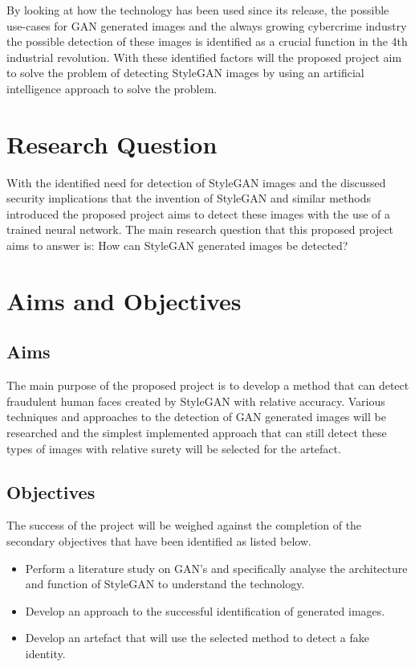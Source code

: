By looking at how the technology has been used since its release, the possible use-cases for GAN generated images and the always growing cybercrime industry the possible detection of these images is identified as a crucial function in the 4th industrial revolution. With these identified factors will the proposed project aim to solve the problem of detecting StyleGAN images by using an artificial intelligence approach to solve the problem.

\section{Research Question}

With the identified need for detection of StyleGAN images and the discussed security implications that the invention of StyleGAN and similar methods introduced the proposed project aims to detect these images with the use of a trained neural network. The main research question that this proposed project aims to answer is: How can StyleGAN generated images be detected?

\section{Aims and Objectives}
\subsection{Aims}

The main purpose of the proposed project is to develop a method that can detect fraudulent human faces created by StyleGAN with relative accuracy. Various techniques and approaches to the detection of GAN generated images will be researched and the simplest implemented approach that can still detect these types of images with relative surety will be selected for the artefact.

\subsection{Objectives}

The success of the project will be weighed against the completion of the secondary objectives that have been identified as listed below.

\begin{itemize}
	\item Perform a literature study on GAN's and specifically analyse the architecture and function of StyleGAN to understand the technology.
	\item Develop an approach to the successful identification of generated images.
	\item Develop an artefact that will use the selected method to detect a fake identity. 
\end{itemize}

